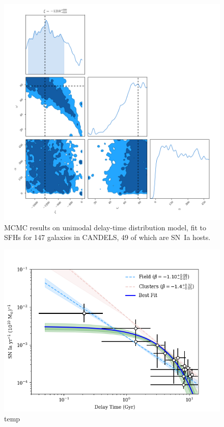 \documentclass[apj]{aastex62}
\begin{document}
\begin{figure}[t] %
   \centering
   \includegraphics[width=6.5in]{figure_sfh_corners} 
   \caption{\footnotesize MCMC results on unimodal delay-time distribution model, fit to SFHs for 147 galaxies in CANDELS, 49 of which are SN~Ia hosts.}
   \label{fig:mcmc_sfd}
\end{figure}


\begin{figure}[t] %
   \centering
   \includegraphics[width=6.5in]{figure_loglog_dtd}
   \caption{\footnotesize temp}
   \label{fig:logsnrate}
\end{figure}
\end{document}
